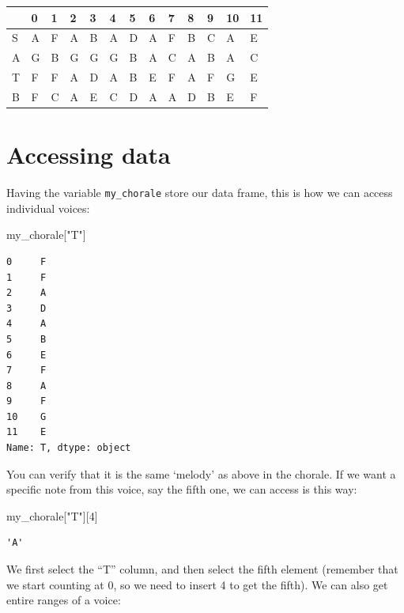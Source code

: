 \documentclass[
  a4paperpaper,
  ,captions=tableheading
]{scrbook}
\newenvironment{Shaded}{\begin{snugshade}}{\end{snugshade}}
\newcommand{\DecValTok}[1]{\textcolor[rgb]{0.68,0.00,0.00}{#1}}
\newcommand{\NormalTok}[1]{\textcolor[rgb]{0.00,0.23,0.31}{#1}}
\newcommand{\StringTok}[1]{\textcolor[rgb]{0.13,0.47,0.30}{#1}}
\begin{document}
\begin{longtable}[]{@{}lllllllllllll@{}}
\toprule\noalign{}
& 0 & 1 & 2 & 3 & 4 & 5 & 6 & 7 & 8 & 9 & 10 & 11 \\
\midrule\noalign{}
\endhead
\bottomrule\noalign{}
\endlastfoot
S & A & F & A & B & A & D & A & F & B & C & A & E \\
A & G & B & G & G & G & B & A & C & A & B & A & C \\
T & F & F & A & D & A & B & E & F & A & F & G & E \\
B & F & C & A & E & C & D & A & A & D & B & E & F \\
\end{longtable}

\hypertarget{accessing-data}{%
\section{Accessing data}\label{accessing-data}}

Having the variable \texttt{my\_chorale} store our data frame, this is
how we can access individual voices:

\begin{Shaded}
\begin{Highlighting}[]
\NormalTok{my\_chorale[}\StringTok{"T"}\NormalTok{]}
\end{Highlighting}
\end{Shaded}

\begin{verbatim}
0     F
1     F
2     A
3     D
4     A
5     B
6     E
7     F
8     A
9     F
10    G
11    E
Name: T, dtype: object
\end{verbatim}

You can verify that it is the same `melody' as above in the chorale. If
we want a specific note from this voice, say the fifth one, we can
access is this way:

\begin{Shaded}
\begin{Highlighting}[]
\NormalTok{my\_chorale[}\StringTok{"T"}\NormalTok{][}\DecValTok{4}\NormalTok{]}
\end{Highlighting}
\end{Shaded}

\begin{verbatim}
'A'
\end{verbatim}

We first select the ``T'' column, and then select the fifth element
(remember that we start counting at 0, so we need to insert 4 to get the
fifth). We can also get entire ranges of a voice:
\end{document}
